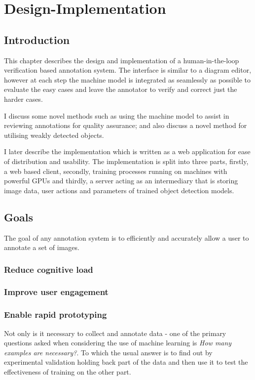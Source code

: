 \chapter{Design-Implementation}
\label{chap:design} 

\section{Introduction}

This chapter describes the design and implementation of a human-in-the-loop verification based annotation system. The interface is similar to a diagram editor, however at each step the machine model is integrated as seamlessly as possible to evaluate the easy cases and leave the annotator to verify and correct just the harder cases. 

I discuss some novel methods such as using the machine model to assist in reviewing annotations for quality assurance; and also discuss a novel method for utilising weakly detected objects.

I later describe the implementation which is written as a web application for ease of distribution and usability. The implementation is split into three parts, firstly, a web based client, secondly, training processes running on machines with powerful \gls{GPU}s and thirdly, a server acting as an intermediary that is storing image data, user actions and parameters of trained object detection models.

\section {Goals}

The goal of any annotation system is to efficiently and accurately allow a user to annotate a set of images.

\subsection {Reduce cognitive load}

\subsection {Improve user engagement}

\subsection {Enable rapid prototyping}
Not only is it necessary to collect and annotate data - one of the primary questions asked when considering the use of machine learning is \emph{How many examples are necessary?}. To which the usual answer is to find out by experimental validation holding back  part of the data and then use it to test the effectiveness of training on the other part.


